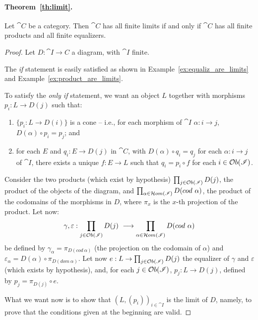\documentclass[a4paper, twoside,openright]{report}
\theoremstyle{plain}
\theoremstyle{definition}
\begin{document}
\paragraph{Theorem~\ref{th:limit}.}
 Let $\cat C$ be a category. Then $\cat C$ has all finite limits if and only if $\cat C$ has all finite products and all finite equalizers.
\begin{proof}
    Let $D: \cat{I \rightarrow C}$ a diagram, with $\cat I$ finite.
    
    The \emph{if} statement is easily satisfied as shown in Example~\ref{ex:equaliz_are_limits} and Example~\ref{ex:product_are_limits}.

    To satisfy the \emph{only if} statement, we want an object $L$ together with morphisms $p_i : L \rightarrow D(j)$ such that:
    \begin{enumerate}
        \item\label{item:cone} $\{p_i: L \rightarrow D(i)\}$ is a cone -- i.e., for each morphism of $\cat I$ $\alpha : i \rightarrow j$, $D(\alpha) \circ p_i = p_j$; and
        \item\label{item:univ_prop} for each $E$ and $q_i : E \rightarrow D(j)$ in $\cat C$, with $D(\alpha) \circ q_i = q_j$ for each $\alpha : i \rightarrow j$ of $\cat I$, there exists a unique $f: E \rightarrow L$ such that $q_i = p_i \circ f$ for each $i \in \mathcal{O}b(\mathscr{I})$.
    \end{enumerate}

    Consider the two products (which exist by hypothesis) $\prod_{j \in \mathcal{O}b(\mathscr{I})} D(j)$, the product of the objects of the diagram, and $\prod_{\alpha \in \Hom(\cat I)}D(cod \ \alpha)$, the product of the codomains of the morphisms in $D$, where $\pi_x$ is the $x$-th projection of the product.
    Let now:
    \[
        \gamma, \varepsilon : \prod_{j \in \mathcal{O}b(\mathscr{I})}D(j) \ \longrightarrow \prod_{\alpha \in \mathcal{H}om(\mathscr{I})} D(cod \ \alpha)
    \]
    be defined by $\gamma_\alpha = \pi_{D(cod\ \alpha)}$ (the projection on the codomain of $\alpha$) and $\varepsilon_\alpha = D(\alpha) \circ \pi_{D(dom \ \alpha)}$.
    Let now $e: L \rightarrow \prod_{j \in \mathcal{O}b(\mathscr{I})}D(j)$ the equalizer of $\gamma$ and $\varepsilon$ (which exists by hypothesis), and, for each $j \in \mathcal{O}b(\mathscr{I})$, $p_j: L \rightarrow D(j)$, defined by $p_j = \pi_{D(j)} \circ e$.
    
    What we want now is to show that $(L, (p_i))_{i \in \cat I}$ is the limit of $D$, namely, to prove that the conditions given at the beginning are valid.


\end{proof}
\end{document}
